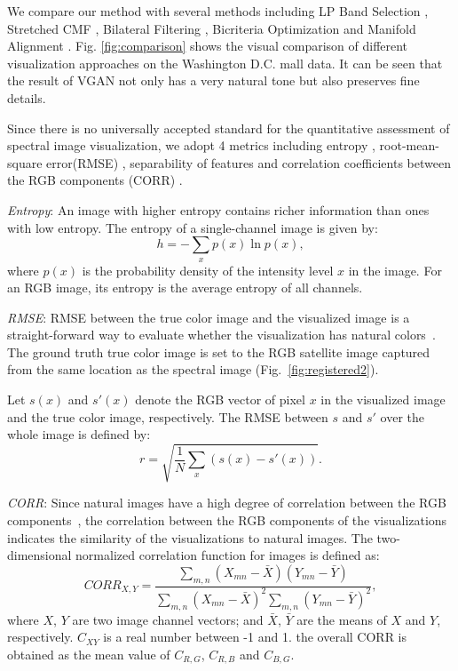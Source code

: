 \documentclass[10pt,conference,a4paper]{IEEEtran}
\begin{document}
We compare our method with several methods including LP Band Selection \cite{su2014LP}, Stretched CMF \cite{cmf2005}, Bilateral Filtering \cite{kotwal2010visualization}, Bicriteria Optimization \cite{bicriteria2012} and Manifold Alignment \cite{liao2016hscolor}.
Fig. \ref{fig:comparison} shows the visual comparison of different visualization approaches on the Washington D.C. mall data.
It can be seen that the result of VGAN not only has a very natural tone but also preserves fine details.

Since there is no universally accepted standard for the quantitative assessment of spectral image visualization,  we adopt 4 metrics including entropy \cite{kotwal2010visualization}, root-mean-square error(RMSE) \cite{zhu2007evaluation}, separability of features \cite{cui2009interactive} and correlation coefficients between the RGB components (CORR) \cite{zhu2007evaluation}.

\emph{Entropy}: An image
with higher entropy contains richer information than ones with
low entropy. The entropy of a single-channel image is given by:
\begin{equation}\label{eq:entropy}
  h=-\sum_{x}p(x)\ln p(x),
\end{equation}
where $p(x)$ is the probability density of the intensity level $x$ in
the image. For an RGB image, its entropy is the average entropy
of all channels.

\emph{RMSE}: RMSE between the true color image and the visualized
image is a straight-forward way to evaluate whether the visualization
has natural colors~\cite{zhu2007evaluation}. The ground truth true color image is set to the RGB satellite image captured from the same location as the spectral image (Fig.~\ref{fig:registered2}).

Let $s(x)$ and $s'(x)$  denote the RGB vector of pixel $x$
in the visualized image and the true color image, respectively. The RMSE
between $s$ and $s'$ over the whole image is defined by:
\begin{equation}\label{eq:rmse}
  r = \sqrt{\frac{1}{N}\sum_x \left( s(x)-s'(x) \right)}.
\end{equation}

\emph{CORR}:
Since natural images have a high degree of correlation
between the RGB components~\cite{zhu2007evaluation}, the correlation between the RGB components of the
visualizations indicates the similarity of the visualizations to natural images.
The two-dimensional normalized correlation function for images is defined as:
\begin{equation}\label{eq:corr}
  CORR_{X,Y}=\frac{\sum_{m,n} (X_{mn}-\bar{X})(Y_{mn}-\bar{Y})}{\sum_{m,n}(X_{mn}-\bar{X})^2 \sum_{m,n} (Y_{mn}-\bar{Y})^2},
\end{equation}
where $X$, $Y$ are two image channel vectors; and $\bar{X}$, $\bar{Y}$ are the means
of $X$ and $Y$, respectively. $C_{XY}$ is a real number between -1
and 1.
the overall CORR is obtained as the mean value of $C_{R,G}$, $C_{R,B}$ and $C_{B,G}$.
\end{document}
